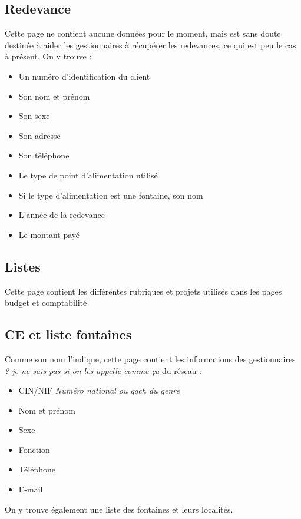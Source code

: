 \documentclass[a4paper, 11pt]{article}
\begin{document}
\subsection{Redevance}
Cette page ne contient aucune données pour le moment, mais est sans doute destinée à aider les gestionnaires à récupérer les redevances, ce qui est peu le cas à présent. On y trouve :

\begin{itemize}
        \item Un numéro d'identification du client
        \item Son nom et prénom
        \item Son sexe
        \item Son adresse
        \item Son téléphone
        \item Le type de point d'alimentation utilisé
        \item Si le type d'alimentation est une fontaine, son nom
        \item L'année de la redevance
        \item Le montant payé
    \end{itemize}

\subsection{Listes}
Cette page contient les différentes rubriques et projets utilisés dans les pages budget et comptabilité

\subsection{CE et liste fontaines}
Comme son nom l'indique, cette page contient les informations des gestionnaires \emph{? je ne sais pas si on les appelle comme ça} du réseau :

\begin{itemize}
    \item CIN/NIF \emph{Numéro national ou qqch du genre}
    \item Nom et prénom
    \item Sexe
    \item Fonction
    \item Téléphone
    \item E-mail
\end{itemize}

On y trouve également une liste des fontaines et leurs localités.
\end{document}
